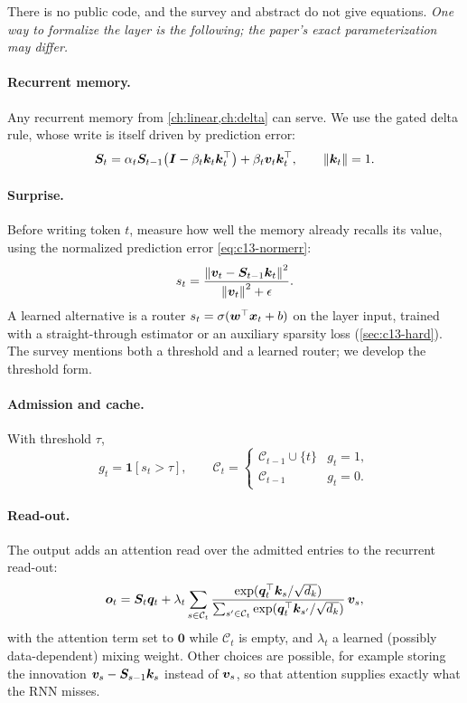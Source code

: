 There is no public code, and the survey and abstract do not give equations. \emph{One way to
formalize the layer is the following; the paper's exact parameterization may differ.}

\paragraph{Recurrent memory.} Any recurrent memory from \cref{ch:linear,ch:delta} can serve. We use
the gated delta rule, whose write is itself driven by prediction error:
\begin{equation}\label{eq:c13-ham-rnn}
  \bm{S}_t = \alpha_t\bm{S}_{t-1}\bigl(\bm{I}-\beta_t\bm{k}_t\bm{k}_t^{\top}\bigr)+\beta_t\bm{v}_t\bm{k}_t^{\top},
  \qquad \left\lVert \bm{k}_t\right\rVert=1 .
\end{equation}

\paragraph{Surprise.} Before writing token $t$, measure how well the memory already recalls its value,
using the normalized prediction error \eqref{eq:c13-normerr}:
\begin{equation}\label{eq:c13-ham-surprise}
  s_t = \frac{\left\lVert \bm{v}_t-\bm{S}_{t-1}\bm{k}_t\right\rVert^2}{\left\lVert \bm{v}_t\right\rVert^2+\epsilon}.
\end{equation}
A learned alternative is a router $s_t=\sigma(\bm{w}^{\top}\bm{x}_t+b)$ on the layer input, trained with a
straight-through estimator or an auxiliary sparsity loss (\cref{sec:c13-hard}). The survey mentions
both a threshold and a learned router; we develop the threshold form.

\paragraph{Admission and cache.} With threshold $\tau$,
\begin{equation}\label{eq:c13-ham-admit}
  g_t=\mathbf{1}[s_t>\tau],\qquad
  \mathcal{C}_t=\begin{cases}\mathcal{C}_{t-1}\cup\{t\} & g_t=1,\\ \mathcal{C}_{t-1} & g_t=0.\end{cases}
\end{equation}

\paragraph{Read-out.} The output adds an attention read over the admitted entries to the recurrent
read-out:
\begin{equation}\label{eq:c13-ham-read}
  \bm{o}_t = \bm{S}_t\bm{q}_t + \lambda_t\sum_{s\in\mathcal{C}_t}
  \frac{\exp(\bm{q}_t^{\top}\bm{k}_s/\sqrt{d_k})}{\sum_{s'\in\mathcal{C}_t}\exp(\bm{q}_t^{\top}\bm{k}_{s'}/\sqrt{d_k})}\,\bm{v}_s ,
\end{equation}
with the attention term set to $\bm{0}$ while $\mathcal{C}_t$ is empty, and $\lambda_t$ a learned
(possibly data-dependent) mixing weight. Other choices are possible, for example storing the
innovation $\bm{v}_s-\bm{S}_{s-1}\bm{k}_s$ instead of $\bm{v}_s$, so that attention supplies exactly what the
RNN misses.

